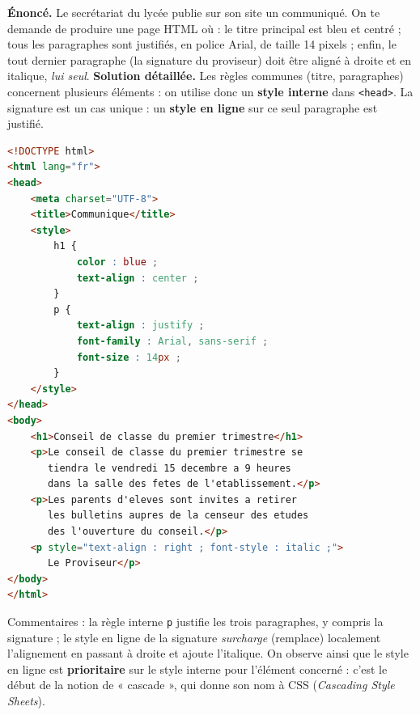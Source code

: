 \documentclass[11pt]{article}
\begin{document}
\begin{exoresolu}
\textbf{Énoncé.} Le secrétariat du lycée publie sur son site un communiqué. On te demande de produire une page HTML où : le titre principal est bleu et centré ; tous les paragraphes sont justifiés, en police Arial, de taille 14 pixels ; enfin, le tout dernier paragraphe (la signature du proviseur) doit être aligné à droite et en italique, \emph{lui seul}.
\tcblower
\textbf{Solution détaillée.} Les règles communes (titre, paragraphes) concernent plusieurs éléments : on utilise donc un \textbf{style interne} dans \texttt{<head>}. La signature est un cas unique : un \textbf{style en ligne} sur ce seul paragraphe est justifié.
\begin{lstlisting}[language=HTML]
<!DOCTYPE html>
<html lang="fr">
<head>
    <meta charset="UTF-8">
    <title>Communique</title>
    <style>
        h1 {
            color : blue ;
            text-align : center ;
        }
        p {
            text-align : justify ;
            font-family : Arial, sans-serif ;
            font-size : 14px ;
        }
    </style>
</head>
<body>
    <h1>Conseil de classe du premier trimestre</h1>
    <p>Le conseil de classe du premier trimestre se
       tiendra le vendredi 15 decembre a 9 heures
       dans la salle des fetes de l'etablissement.</p>
    <p>Les parents d'eleves sont invites a retirer
       les bulletins aupres de la censeur des etudes
       des l'ouverture du conseil.</p>
    <p style="text-align : right ; font-style : italic ;">
       Le Proviseur</p>
</body>
</html>
\end{lstlisting}
Commentaires : la règle interne \texttt{p} justifie les trois paragraphes, y compris la signature ; le style en ligne de la signature \emph{surcharge} (remplace) localement l'alignement en passant à droite et ajoute l'italique. On observe ainsi que le style en ligne est \textbf{prioritaire} sur le style interne pour l'élément concerné : c'est le début de la notion de « cascade », qui donne son nom à CSS (\emph{Cascading Style Sheets}).
\end{exoresolu}
\end{document}
